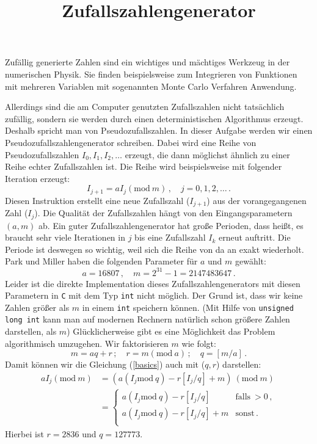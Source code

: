 \documentclass{article}[12pt]
\title{Zufallszahlengenerator}
\begin{document}
\maketitle
\noindent Zufällig generierte Zahlen sind ein wichtiges und mächtiges Werkzeug in der numerischen Physik. 
Sie finden beispielsweise zum Integrieren von Funktionen mit mehreren Variablen mit sogenannten Monte Carlo Verfahren Anwendung.

Allerdings sind die am Computer genutzten Zufallszahlen nicht tatsächlich zufällig, sondern sie werden durch einen deterministischen Algorithmus erzeugt. 
Deshalb spricht man von Pseudozufallszahlen.
In dieser Aufgabe werden wir einen Pseudozufallszahlengenerator schreiben. 
Dabei wird eine Reihe von Pseudozufallszahlen $I_0, I_1, I_2, \ldots$ erzeugt, die dann möglichst ähnlich zu einer Reihe echter Zufallszahlen ist.
Die Reihe wird beispielsweise mit folgender Iteration erzeugt:
\begin{equation}
  I_{j+1}=a I_{j} \left( \mathrm{mod}\ m\right)\,,\quad j=0,1,2,\ldots\,.
  \label{basics}
\end{equation}
Diesen Instruktion erstellt eine neue Zufallszahl ($I_{j+1}$) aus der vorangegangenen Zahl ($I_j$). Die Qualität der Zufallszahlen 
hängt von den Eingangsparametern $(a,m)$ ab. 
Ein guter Zufallszahlengenerator hat große Perioden, dass hei\ss{}t, es braucht sehr viele Iterationen in $j$ bis eine Zufallszahl $I_k$ erneut auftritt.
Die Periode ist deswegen so wichtig, weil sich die Reihe von da an exakt wiederholt.
Park und Miller haben die folgenden Parameter für $a$ und $m$ gewählt:
\begin{equation}
  a=16807\,,\quad m=2^{31}-1=2147483647\,. 
\end{equation}
Leider ist die direkte Implementation dieses Zufallszahlengenerators mit diesen Parametern in \texttt{C} mit dem Typ \texttt{int} nicht möglich. 
Der Grund ist, dass wir keine Zahlen größer als $m$ in einem \texttt{int} speichern können. 
(Mit Hilfe von \texttt{unsigned long int} kann man auf modernen Rechnern natürlich schon größere Zahlen darstellen, als $m$)
Glücklicherweise gibt es eine Möglichkeit das Problem algorithmisch umzugehen. 
Wir faktorisieren $m$ wie folgt:
\begin{equation}
  m = aq + r\,;\quad r= m \left(\mathrm{mod}\ a\right)\,;\quad q= \left[m/a\right]\,.
\end{equation}
Damit können wir die Gleichung (\ref{basics}) auch mit ($q,r$) darstellen:
\begin{equation}
  \begin{split}
    a I_j \left( \mathrm{mod}\ m\right)&=  
    (a\left(I_j \mathrm{mod}\ q\right) -r \left[I_j/q\right] + m)\ (\mathrm{mod}\ m)\\
    &=  \begin{cases}
      a\left(I_j \mathrm{mod}\ q\right) -r \left[I_j/q\right] & \mathrm{falls~}>0\,, \\ 
      a\left(I_j \mathrm{mod}\ q\right) -r \left[I_j/q\right] + m & \mathrm{sonst}\,. \\ 
    \end{cases}
  \end{split}
  \label{algo}
\end{equation}
Hierbei ist $r=2836$ und $q=127773$. 
\end{document}
